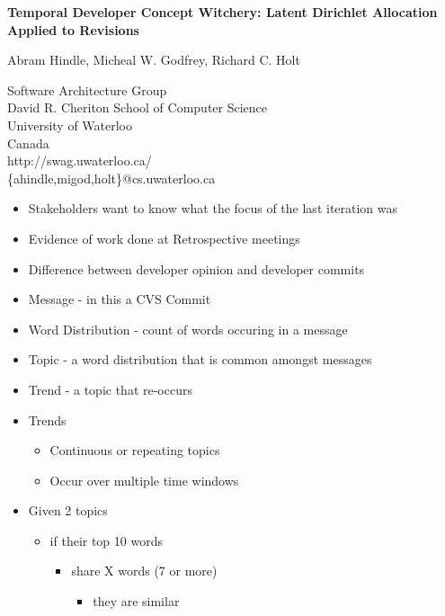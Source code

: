 \documentclass[titlepage,usenames,a4,landscape,semhelv,16pt]{seminar}
\author{
\names \\ 
{\small Software Architecture Group }\\
\small David R. Cheriton School of Computer Science\\
\small University of Waterloo\\
\small Canada\\
ahindle@cs.uwaterloo.ca
}
\newcommand{\gettitle}{Temporal Developer Concept Witchery: Latent Dirichlet Allocation Applied to Revisions}
\newcommand{\gettitleproper}{\gettitle}
\newcommand{\names}{Abram Hindle, Micheal W. Godfrey, Richard C. Holt}
\begin{document}
\pagestyle{fancy} %
\begin{slide}

\begin{center}
{\bf \LARGE \gettitleproper }

{\names } 

{\small Software Architecture Group }\\[-.5em]
{\small David R. Cheriton School of Computer Science}\\[-.5em]
{\small University of Waterloo}\\[-.5em]
{\small Canada}\\[-.5em]
{\small http://swag.uwaterloo.ca/}\\
\{ahindle,migod,holt\}@cs.uwaterloo.ca


\end{center}

\begin{itemize}
\item Stakeholders want to know what the focus of the last iteration was
\item Evidence of work done at Retrospective meetings
\item Difference between developer opinion and developer commits


\end{itemize}
\begin{itemize}
\item Message - in this a CVS Commit
\item Word Distribution - count of words occuring in a message
\item Topic - a word distribution that is common amongst messages
\item Trend - a topic that re-occurs

\newslide
{}

\end{itemize}
\begin{itemize}
\item Trends
	\begin{itemize}
	\item Continuous or repeating topics
	\item Occur over multiple time windows

\end{itemize}
\end{itemize}
\begin{itemize}
\item Given 2 topics
	\begin{itemize}
	\item if their top 10 words 
		\begin{itemize}
		\item share X words (7 or more)
			\begin{itemize}
			\item they are similar


\end{itemize}
\end{itemize}
\end{itemize}
\end{itemize}
\end{slide}
\end{document}
